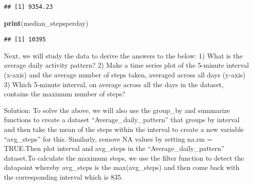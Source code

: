 \documentclass[
]{article}
\newenvironment{Shaded}{\begin{snugshade}}{\end{snugshade}}
\newcommand{\AttributeTok}[1]{\textcolor[rgb]{0.13,0.29,0.53}{#1}}
\newcommand{\CommentTok}[1]{\textcolor[rgb]{0.56,0.35,0.01}{\textit{#1}}}
\newcommand{\ConstantTok}[1]{\textcolor[rgb]{0.56,0.35,0.01}{#1}}
\newcommand{\DecValTok}[1]{\textcolor[rgb]{0.00,0.00,0.81}{#1}}
\newcommand{\FunctionTok}[1]{\textcolor[rgb]{0.13,0.29,0.53}{\textbf{#1}}}
\newcommand{\NormalTok}[1]{#1}
\newcommand{\OtherTok}[1]{\textcolor[rgb]{0.56,0.35,0.01}{#1}}
\newcommand{\SpecialCharTok}[1]{\textcolor[rgb]{0.81,0.36,0.00}{\textbf{#1}}}
\newcommand{\StringTok}[1]{\textcolor[rgb]{0.31,0.60,0.02}{#1}}
\begin{document}
\begin{verbatim}
## [1] 9354.23
\end{verbatim}

\begin{Shaded}
\begin{Highlighting}[]
\FunctionTok{print}\NormalTok{(median\_stepsperday)}
\end{Highlighting}
\end{Shaded}

\begin{verbatim}
## [1] 10395
\end{verbatim}

Next, we will study the data to derive the answers to the below: 1) What
is the average daily activity pattern? 2) Make a time series plot of the
5-minute interval (x-axis) and the average number of steps taken,
averaged across all days (y-axis) 3) Which 5-minute interval, on average
across all the days in the dataset, contains the maximum number of
steps?

Solution: To solve the above, we will also use the group\_by and
summarize functions to create a dataset ``Average\_daily\_pattern'' that
groups by interval and then take the mean of the steps within the
interval to create a new variable ``avg\_steps'' for this. Similarly,
remove NA values by setting na.rm = TRUE.Then plot interval and
avg\_steps in the ``Average\_daily\_pattern'' dataset.To calculate the
maximum steps, we use the filter function to detect the datapoint
whereby avg\_steps is the max(avg\_steps) and then come back with the
corresponding interval which is 835.

\begin{Shaded}
\end{Shaded}
\end{document}
